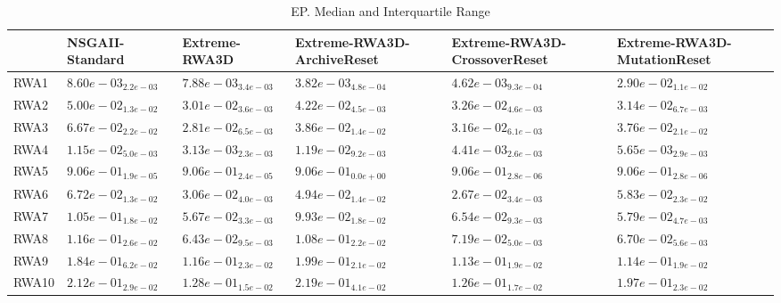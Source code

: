 \documentclass{article}
\begin{document}
\begin{table}
\caption{EP. Median and Interquartile Range}
\label{table: EP}
\centering
\begin{scriptsize}
\begin{tabular}{llllll}
\hline & NSGAII-Standard & Extreme-RWA3D & Extreme-RWA3D-ArchiveReset & Extreme-RWA3D-CrossoverReset &  Extreme-RWA3D-MutationReset\\
\hline 
RWA1 & $  8.60e-03_{ 2.2e-03}$ & $  7.88e-03_{ 3.4e-03}$ & \cellcolor{gray95}$  3.82e-03_{ 4.8e-04}$ & \cellcolor{gray25}$  4.62e-03_{ 9.3e-04}$ & $  2.90e-02_{ 1.1e-02}$ \\
RWA2 & $  5.00e-02_{ 1.3e-02}$ & \cellcolor{gray95}$  3.01e-02_{ 3.6e-03}$ & $  4.22e-02_{ 4.5e-03}$ & $  3.26e-02_{ 4.6e-03}$ & \cellcolor{gray25}$  3.14e-02_{ 6.7e-03}$ \\
RWA3 & $  6.67e-02_{ 2.2e-02}$ & \cellcolor{gray95}$  2.81e-02_{ 6.5e-03}$ & $  3.86e-02_{ 1.4e-02}$ & \cellcolor{gray25}$  3.16e-02_{ 6.1e-03}$ & $  3.76e-02_{ 2.1e-02}$ \\
RWA4 & $  1.15e-02_{ 5.0e-03}$ & \cellcolor{gray95}$  3.13e-03_{ 2.3e-03}$ & $  1.19e-02_{ 9.2e-03}$ & \cellcolor{gray25}$  4.41e-03_{ 2.6e-03}$ & $  5.65e-03_{ 2.9e-03}$ \\
RWA5 & $  9.06e-01_{ 1.9e-05}$ & $  9.06e-01_{ 2.4e-05}$ & \cellcolor{gray95}$  9.06e-01_{ 0.0e+00}$ & $  9.06e-01_{ 2.8e-06}$ & \cellcolor{gray25}$  9.06e-01_{ 2.8e-06}$ \\
RWA6 & $  6.72e-02_{ 1.3e-02}$ & \cellcolor{gray25}$  3.06e-02_{ 4.0e-03}$ & $  4.94e-02_{ 1.4e-02}$ & \cellcolor{gray95}$  2.67e-02_{ 3.4e-03}$ & $  5.83e-02_{ 2.3e-02}$ \\
RWA7 & $  1.05e-01_{ 1.8e-02}$ & \cellcolor{gray95}$  5.67e-02_{ 3.3e-03}$ & $  9.93e-02_{ 1.8e-02}$ & $  6.54e-02_{ 9.3e-03}$ & \cellcolor{gray25}$  5.79e-02_{ 4.7e-03}$ \\
RWA8 & $  1.16e-01_{ 2.6e-02}$ & \cellcolor{gray95}$  6.43e-02_{ 9.5e-03}$ & $  1.08e-01_{ 2.2e-02}$ & $  7.19e-02_{ 5.0e-03}$ & \cellcolor{gray25}$  6.70e-02_{ 5.6e-03}$ \\
RWA9 & $  1.84e-01_{ 6.2e-02}$ & $  1.16e-01_{ 2.3e-02}$ & $  1.99e-01_{ 2.1e-02}$ & \cellcolor{gray95}$  1.13e-01_{ 1.9e-02}$ & \cellcolor{gray25}$  1.14e-01_{ 1.9e-02}$ \\
RWA10 & $  2.12e-01_{ 2.9e-02}$ & \cellcolor{gray25}$  1.28e-01_{ 1.5e-02}$ & $  2.19e-01_{ 4.1e-02}$ & \cellcolor{gray95}$  1.26e-01_{ 1.7e-02}$ & $  1.97e-01_{ 2.3e-02}$ \\
\hline
\end{tabular}
\end{scriptsize}
\end{table}
\end{document}
